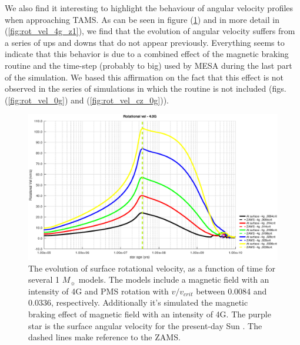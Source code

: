 \documentclass[fleqn,usenatbib]{mnras}
\begin{document}
We also find it interesting to highlight the behaviour of angular velocity profiles when approaching TAMS. As can be seen in figure (\ref{fig:rot_vel_4g}) and in more detail in (\ref{fig:rot_vel_4g_z1}), we find that the evolution of angular velocity suffers from a series of ups and downs that do not appear previously. Everything seems to indicate that this behavior is due to a combined effect of the magnetic braking routine and the time-step (probably to big) used by MESA during the last part of the simulation. We based this affirmation on the fact that this effect is not observed in the series of simulations in which the routine is not included (figs. (\ref{fig:rot_vel_0g}) and (\ref{fig:rot_vel_cz_0g})).\par

\begin{figure}
	\includegraphics[width=\columnwidth]{figures/rot_vel_4g.eps}
    \caption{The evolution of surface rotational velocity, as a function of time for several 1 $M_{\sun}$ models. The models include a magnetic field with an intensity of 4G and PMS rotation with $v/v_{crit}$ between 0.0084 and 0.0336, respectively. Additionally it's simulated the magnetic braking effect of magnetic field with an intensity of 4G. The purple star is the surface angular velocity for the present-day Sun \citep{Gill2012}. The dashed lines make reference to the ZAMS.}
    \label{fig:rot_vel_4g}
\end{figure}
\end{document}

